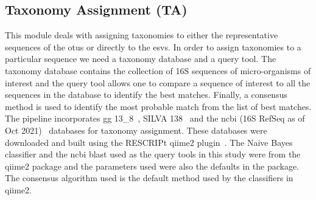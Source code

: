   \subsection*{Taxonomy Assignment (TA)}
  \vspace{-5mm}
  This module deals with assigning taxonomies to either the representative sequences of the \ac{otu}s or directly to the \ac{esv}s.
  In order to assign taxonomies to a particular sequence we need a taxonomy database and a query tool.
  The taxonomy database contains the collection of 16S sequences of micro-organisms of interest and the query tool allows one to compare a sequence of interest to all the sequences in the database to identify the best matches.
  Finally, a consensus method is used to identify the most probable match from the list of best matches.
  The pipeline incorporates \ac{gg} 13\_8~\cite{DeSantis2006}, SILVA 138~\cite{Quast2012} and the \ac{ncbi} (16S RefSeq as of Oct 2021)~\cite{Sayers2009} databases for taxonomy assignment.
  These databases were downloaded and built using the RESCRIPt qiime2 plugin~\cite{iiRESCRIPtReproducibleSequence2021}.
  The Naive Bayes classifier and the \ac{ncbi} blast used as the query tools in this study were from the \ac{qiime2} package and the parameters used were also the defaults in the package.
  The consensus algorithm used is the default method used by the classifiers in \ac{qiime2}.

